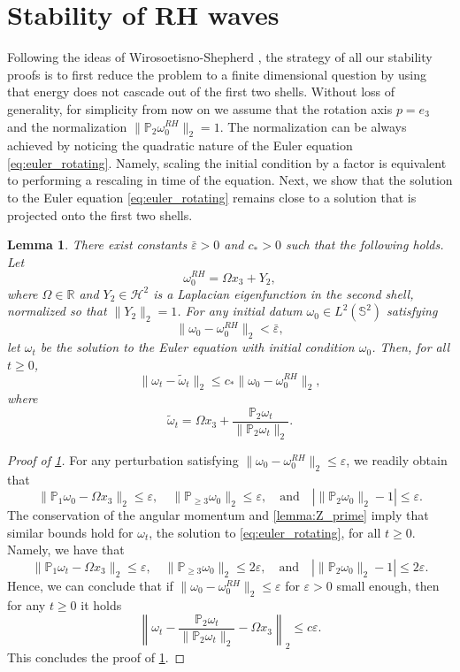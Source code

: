 \documentclass{amsart}
\newtheorem{lemma}{Lemma}[section]
\newtheorem{lemma}{Lemma}[section]  %
\def\eps{{\varepsilon}}
\begin{document}
\section{Stability of RH waves} \label{sec:main}
Following the ideas of Wirosoetisno-Shepherd \cite{Wirosoetisno1999}, the strategy of all our stability proofs is to first reduce the problem to a finite dimensional question by using that energy does not cascade out of the first two shells. Without loss of generality, for simplicity from now on we assume that the rotation axis $p=e_3$ and the normalization $\|\mathbb{P}_2 \omega_0^{RH}\|_2=1$.
The normalization can be always achieved by noticing the quadratic nature of the Euler equation \eqref{eq:euler_rotating}. Namely, scaling the initial condition by a factor is equivalent to performing a rescaling in time of the equation. Next, we show that the solution to the Euler equation \eqref{eq:euler_rotating} remains close to a solution that is projected onto the first two shells.
\begin{lemma}\label{lem:projection1}
There exist constants $\bar\varepsilon > 0$ and $c_*>0$ such that the following holds. Let
\[
    \omega_0^{RH} = \Omega x_3 + Y_2,
\]
where $\Omega \in \mathbb{R}$ and $Y_2 \in \mathcal{H}^2$ is a Laplacian eigenfunction in the second shell, normalized so that $\|Y_2\|_2 = 1$. For any initial datum $\omega_0 \in L^2(\mathbb{S}^2)$ satisfying
\[
    \|\omega_0 - \omega_0^{RH}\|_2 < \bar\varepsilon,
       \]
let $\omega_t$ be the solution to the Euler equation with initial condition $\omega_0$. Then, for all $t \geq 0$,
\[
    \|\omega_t - \tilde\omega_t\|_2 \leq c_* \|\omega_0 - \omega_0^{RH}\|_2,
\]
where
\[
    \tilde\omega_t = \Omega x_3 + \frac{\mathbb{P}_2 \omega_t}{\|\mathbb{P}_2 \omega_t\|_2}.
\]
\end{lemma}
\begin{proof}[Proof of \cref{lem:projection1}]
For any perturbation satisfying $\|\omega_0-\omega_0^{RH}\|_2\leq\varepsilon$, we readily obtain that
$$
\|\mathbb{P}_1\omega_0-\Omega x_3 \|_2\le \eps,\quad \|\mathbb{P}_{\ge 3}\omega_0\|_2\leq\eps,\quad\text{and}\quad |\|\mathbb{P}_2\omega_0\|_2-1|\leq\eps.
$$
The conservation of the angular momentum and \cref{lemma:Z_prime} imply that similar bounds hold for $\omega_t$, the solution to \eqref{eq:euler_rotating}, for all $t\geq0$. Namely, we have that
$$
\|\mathbb{P}_1\omega_t-\Omega x_3 \|_2\le \eps,\quad \|\mathbb{P}_{\ge 3}\omega_0\|_2\leq 2\eps,\quad\text{and}\quad |\|\mathbb{P}_2\omega_0\|_2-1|\leq 2\eps.
$$
Hence, we can conclude that if $\|\omega_0-\omega_0^{RH}\|_2\leq\varepsilon$ for $\varepsilon>0$ small enough, then for any $t\geq0$ it holds
$$
\left\|\omega_t- \frac{\mathbb{P}_2\omega_t}{\|\mathbb{P}_2\omega_t\|_2}-\Omega x_3 \right\|_2\le c\eps.
$$ 
This concludes the proof of \cref{lem:projection1}.
\end{proof}
\end{document}
